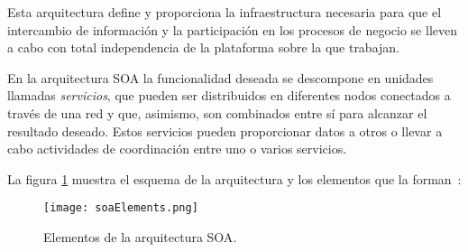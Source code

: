 Esta arquitectura define y proporciona la infraestructura necesaria para que el 
intercambio de información y la participación en los procesos de negocio se 
lleven a cabo con total independencia de la plataforma sobre la que trabajan.

En la arquitectura \acs{SOA} la funcionalidad deseada se descompone en unidades
llamadas \emph{servicios}, que pueden ser distribuidos en diferentes nodos 
conectados a través de una red y que, asimismo, son combinados entre sí para 
alcanzar el resultado deseado. Estos servicios pueden proporcionar datos a 
otros o llevar a cabo actividades de coordinación entre uno o varios servicios.

La figura \ref{fig:soaElements} muestra el esquema de la arquitectura y los 
elementos que la forman~\cite{bib:soa}:

  \begin{figure}[H]
    \begin{center}
      \texttt{[image: soaElements.png]}
      \caption{Elementos de la arquitectura \acs{SOA}.}
      \label{fig:soaElements}
    \end{center}
  \end{figure}

